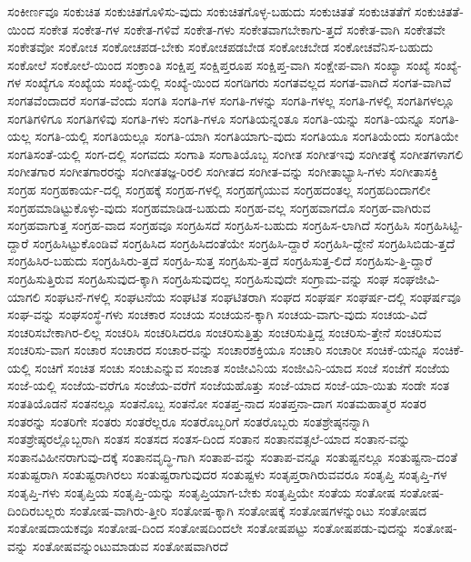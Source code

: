 {ಸಂಕೀರ್ಣವೂ
ಸಂಕುಚಿತ
ಸಂಕುಚಿತಗೊಳಿಸು-ವುದು
ಸಂಕುಚಿತಗೊಳ್ಳ-ಬಹುದು
ಸಂಕುಚಿತತೆ
ಸಂಕುಚಿತತೆಗೆ
ಸಂಕುಚಿತತೆ-ಯಿಂದ
ಸಂಕೇತ
ಸಂಕೇತ-ಗಳ
ಸಂಕೇತ-ಗಳಿವೆ
ಸಂಕೇತ-ಗಳು
ಸಂಕೇತವಾಗಬೇಕಾಗು-ತ್ತದೆ
ಸಂಕೇತ-ವಾಗಿ
ಸಂಕೇತವೇ
ಸಂಕೇತವೋ
ಸಂಕೋಚ
ಸಂಕೋಚಪಡ-ಬೇಕು
ಸಂಕೋಚಪಡಬೇಡ
ಸಂಕೋಚಬೇಡ
ಸಂಕೋಚವೆನಿಸ-ಬಹುದು
ಸಂಕೋಲೆ
ಸಂಕೋಲೆ-ಯಿಂದ
ಸಂಕ್ರಾಂತಿ
ಸಂಕ್ಷಿಪ್ತ
ಸಂಕ್ಷಿಪ್ತರೂಪ
ಸಂಕ್ಷಿಪ್ತ-ವಾಗಿ
ಸಂಕ್ಷೇಪ-ವಾಗಿ
ಸಂಖ್ಯಾ
ಸಂಖ್ಯೆ
ಸಂಖ್ಯೆ-ಗಳ
ಸಂಖ್ಯೆಗೂ
ಸಂಖ್ಯೆಯ
ಸಂಖ್ಯೆ-ಯಲ್ಲಿ
ಸಂಖ್ಯೆ-ಯಿಂದ
ಸಂಗಡಿಗರು
ಸಂಗತವಲ್ಲದ
ಸಂಗತ-ವಾಗಿದೆ
ಸಂಗತ-ವಾಗಿವೆ
ಸಂಗತವೆಂದಾದರೆ
ಸಂಗತ-ವೆಂದು
ಸಂಗತಿ
ಸಂಗತಿ-ಗಳ
ಸಂಗತಿ-ಗಳನ್ನು
ಸಂಗತಿ-ಗಳಲ್ಲ
ಸಂಗತಿ-ಗಳಲ್ಲಿ
ಸಂಗತಿಗಳಲ್ಲೂ
ಸಂಗತಿಗಳಿಗೂ
ಸಂಗತಿಗಳಿವು
ಸಂಗತಿ-ಗಳು
ಸಂಗತಿ-ಗಳೂ
ಸಂಗತಿಯನ್ನಂತೂ
ಸಂಗತಿ-ಯನ್ನು
ಸಂಗತಿ-ಯನ್ನೂ
ಸಂಗತಿ-ಯಲ್ಲ
ಸಂಗತಿ-ಯಲ್ಲಿ
ಸಂಗತಿಯಲ್ಲೂ
ಸಂಗತಿ-ಯಾಗಿ
ಸಂಗತಿಯಾಗು-ವುದು
ಸಂಗತಿಯೂ
ಸಂಗತಿಯೆಂದು
ಸಂಗತಿಯೇ
ಸಂಗತಿಸಂತೆ-ಯಲ್ಲಿ
ಸಂಗ-ದಲ್ಲಿ
ಸಂಗವದು
ಸಂಗಾತಿ
ಸಂಗಾತಿಯೊಬ್ಬ
ಸಂಗೀತ
ಸಂಗೀತಇವು
ಸಂಗೀತಕ್ಕೆ
ಸಂಗೀತಗಳಾಗಲಿ
ಸಂಗೀತಗಾರ
ಸಂಗೀತಗಾರರನ್ನು
ಸಂಗೀತತಜ್ಞ-ರಿರಲಿ
ಸಂಗೀತದ
ಸಂಗೀತ-ವನ್ನು
ಸಂಗೀತಾಭ್ಯಾಸಿ-ಗಳು
ಸಂಗೀತಾಸಕ್ತಿ
ಸಂಗ್ರಹ
ಸಂಗ್ರಹಕಾರ್ಯ-ದಲ್ಲಿ
ಸಂಗ್ರಹಕ್ಕೆ
ಸಂಗ್ರಹ-ಗಳಲ್ಲಿ
ಸಂಗ್ರಹಗೈಯುವ
ಸಂಗ್ರಹದಂತಲ್ಲ
ಸಂಗ್ರಹದಿಂದಾಗಲೀ
ಸಂಗ್ರಹಮಾಡಿಟ್ಟುಕೊಳ್ಳು-ವುದು
ಸಂಗ್ರಹಮಾಡಿಡ-ಬಹುದು
ಸಂಗ್ರಹ-ವಲ್ಲ
ಸಂಗ್ರಹವಾಗದೊ
ಸಂಗ್ರಹ-ವಾಗಿರುವ
ಸಂಗ್ರಹವಾಗುತ್ತ
ಸಂಗ್ರಹ-ವಾದ
ಸಂಗ್ರಹವೂ
ಸಂಗ್ರಹಿಸದೆ
ಸಂಗ್ರಹಿಸ-ಬಹುದು
ಸಂಗ್ರಹಿಸ-ಲಾಗಿದೆ
ಸಂಗ್ರಹಿಸಿ
ಸಂಗ್ರಹಿಸಿಟ್ಟಿ-ದ್ದಾರೆ
ಸಂಗ್ರಹಿಸಿಟ್ಟುಕೊಂಡಿವೆ
ಸಂಗ್ರಹಿಸಿದ
ಸಂಗ್ರಹಿಸಿದಂತೆಯೇ
ಸಂಗ್ರಹಿಸಿ-ದ್ದಾರೆ
ಸಂಗ್ರಹಿಸಿ-ದ್ದೇನೆ
ಸಂಗ್ರಹಿಸಿಬಿಡು-ತ್ತದೆ
ಸಂಗ್ರಹಿಸಿರ-ಬಹುದು
ಸಂಗ್ರಹಿಸಿರು-ತ್ತದೆ
ಸಂಗ್ರಹಿ-ಸುತ್ತ
ಸಂಗ್ರಹಿಸು-ತ್ತದೆ
ಸಂಗ್ರಹಿಸುತ್ತ-ಲಿದೆ
ಸಂಗ್ರಹಿಸು-ತ್ತಿ-ದ್ದಾರೆ
ಸಂಗ್ರಹಿಸುತ್ತಿರುವ
ಸಂಗ್ರಹಿಸುವುದ-ಕ್ಕಾಗಿ
ಸಂಗ್ರಹಿಸುವುದಲ್ಲ
ಸಂಗ್ರಹಿಸುವುದೇ
ಸಂಗ್ರಾಮ-ವನ್ನು
ಸಂಘ
ಸಂಘಜೀವಿ-ಯಾಗಲಿ
ಸಂಘಟನೆ-ಗಳಲ್ಲಿ
ಸಂಘಟನೆಯ
ಸಂಘಟಿತ
ಸಂಘಟಿತರಾಗಿ
ಸಂಘದ
ಸಂಘರ್ಷ
ಸಂಘರ್ಷ-ದಲ್ಲಿ
ಸಂಘರ್ಷವೂ
ಸಂಘ-ವನ್ನು
ಸಂಘಸಂಸ್ಥೆ-ಗಳು
ಸಂಚಕಾರ
ಸಂಚಯ
ಸಂಚಯನ-ಕ್ಕಾಗಿ
ಸಂಚಯ-ವಾಗು-ವುದು
ಸಂಚಯ-ವಿದೆ
ಸಂಚರಿಸಬೇಕಾಗಿರ-ಲಿಲ್ಲ
ಸಂಚರಿಸಿ
ಸಂಚರಿಸಿದರೂ
ಸಂಚರಿಸುತ್ತಿತ್ತು
ಸಂಚರಿಸುತ್ತಿದ್ದ
ಸಂಚರಿಸು-ತ್ತೇನೆ
ಸಂಚರಿಸುವ
ಸಂಚರಿಸು-ವಾಗ
ಸಂಚಾರ
ಸಂಚಾರದ
ಸಂಚಾರ-ವನ್ನು
ಸಂಚಾರಶಕ್ತಿಯೂ
ಸಂಚಾರಿ
ಸಂಚಾರೀ
ಸಂಚಿಕೆ-ಯನ್ನೂ
ಸಂಚಿಕೆ-ಯಲ್ಲಿ
ಸಂಚಿಗೆ
ಸಂಚಿತ
ಸಂಚು
ಸಂಚುಎನ್ನುವ
ಸಂಜಾತ
ಸಂಜೀವಿನಿಯ
ಸಂಜೀವಿನಿ-ಯಾದ
ಸಂಜೆ
ಸಂಜೆಗೆ
ಸಂಜೆಯ
ಸಂಜೆ-ಯಲ್ಲಿ
ಸಂಜೆಯ-ವರೆಗೂ
ಸಂಜೆಯ-ವರೆಗೆ
ಸಂಜೆಯಹೊತ್ತು
ಸಂಜೆ-ಯಾದ
ಸಂಜೆ-ಯಾ-ಯಿತು
ಸಂಡೇ
ಸಂತ
ಸಂತತಿಯೊಡನೆ
ಸಂತನಲ್ಲೂ
ಸಂತನೊಬ್ಬ
ಸಂತನೋ
ಸಂತಪ್ತ-ನಾದ
ಸಂತಪ್ತನಾ-ದಾಗ
ಸಂತಮಹಾತ್ಮರ
ಸಂತರ
ಸಂತರನ್ನು
ಸಂತರಿಗೇ
ಸಂತರು
ಸಂತರೆಲ್ಲರೂ
ಸಂತರೊಬ್ಬರಿಗೆ
ಸಂತರೊಬ್ಬರು
ಸಂತಶ್ರೇಷ್ಠನನ್ನಾಗಿ
ಸಂತಶ್ರೇಷ್ಠರಲ್ಲೊಬ್ಬರಾಗಿ
ಸಂತಸ
ಸಂತಸದ
ಸಂತಸ-ದಿಂದ
ಸಂತಾನ
ಸಂತಾನವತ್ಸಲೆ-ಯಾದ
ಸಂತಾನ-ವನ್ನು
ಸಂತಾನವಿಹೀನರಾಗುವು-ದಕ್ಕೆ
ಸಂತಾನವೃದ್ಧಿ-ಗಾಗಿ
ಸಂತಾಪ-ವನ್ನು
ಸಂತಾಪ-ವನ್ನೂ
ಸಂತುಷ್ಟನಲ್ಲೂ
ಸಂತುಷ್ಟನಾ-ದಂತೆ
ಸಂತುಷ್ಟರಾಗಿ
ಸಂತುಷ್ಟರಾಗಿರಲು
ಸಂತುಷ್ಟರಾಗುವುದರ
ಸಂತುಷ್ಟಳು
ಸಂತೃಪ್ತರಾಗಿರುವವರೂ
ಸಂತೃಪ್ತಿ
ಸಂತೃಪ್ತಿ-ಗಳ
ಸಂತೃಪ್ತಿ-ಗಳು
ಸಂತೃಪ್ತಿಯ
ಸಂತೃಪ್ತಿ-ಯನ್ನು
ಸಂತೃಪ್ತಿಯಾಗ-ಬೇಕು
ಸಂತೃಪ್ತಿಯೇ
ಸಂತೆಯ
ಸಂತೋಷ
ಸಂತೋಷ-ದಿಂದಿರಬಲ್ಲರು
ಸಂತೋಷ-ವಾಗಿರು-ತ್ತೀರಿ
ಸಂತೋಷ-ಕ್ಕಾಗಿ
ಸಂತೋಷಕ್ಕೆ
ಸಂತೋಷಗಳನ್ನುಂಟು
ಸಂತೋಷದ
ಸಂತೋಷದಾಯಕವೂ
ಸಂತೋಷ-ದಿಂದ
ಸಂತೋಷದಿಂದಲೇ
ಸಂತೋಷಪಟ್ಟು
ಸಂತೋಷಪಡು-ವುದನ್ನು
ಸಂತೋಷ-ವನ್ನು
ಸಂತೋಷವನ್ನುಂಟುಮಾಡುವ
ಸಂತೋಷವಾಗಿರದೆ
}
